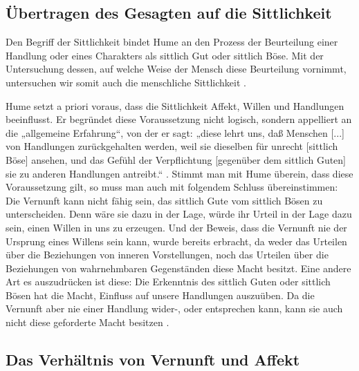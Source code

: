 \documentclass[ngerman,12pt]{diazessay} %
\begin{document}
\begin{doublespace}
\subsection{Übertragen des Gesagten auf die Sittlichkeit}
Den Begriff der Sittlichkeit bindet Hume an den Prozess der Beurteilung einer Handlung oder eines Charakters als sittlich Gut oder sittlich Böse. Mit der Untersuchung dessen, auf welche Weise der Mensch diese Beurteilung vornimmt, untersuchen wir somit auch die menschliche Sittlichkeit \cite[siehe S.532]{Hume.2013}.
\par\bigskip   
Hume setzt a priori voraus, dass die Sittlichkeit Affekt, Willen und Handlungen beeinflusst. Er begründet diese Voraussetzung nicht logisch, sondern appelliert an die „allgemeine Erfahrung“, von der er sagt: „diese lehrt uns, daß Menschen [...] von Handlungen zurückgehalten
werden, weil sie dieselben für unrecht [sittlich Böse] ansehen, und das Gefühl
der Verpflichtung [gegenüber dem sittlich Guten] sie zu anderen Handlungen antreibt.“ \cite[S.533]{Hume.2013}. Stimmt man mit Hume überein, dass diese Voraussetzung gilt, so muss man auch mit folgendem Schluss übereinstimmen: Die Vernunft kann nicht fähig sein, das sittlich Gute vom sittlich Bösen zu unterscheiden. Denn wäre sie dazu in der Lage, würde ihr Urteil in der Lage dazu sein, einen Willen in uns zu erzeugen. Und der Beweis, dass die Vernunft nie der Ursprung eines Willens sein kann, wurde bereits erbracht, da weder das Urteilen über die Beziehungen von inneren Vorstellungen, noch das Urteilen über die Beziehungen von wahrnehmbaren Gegenständen diese Macht besitzt. Eine andere Art es auszudrücken ist diese: Die Erkenntnis des sittlich Guten oder sittlich Bösen hat die Macht, Einfluss auf unsere Handlungen auszuüben. Da die Vernunft aber nie einer Handlung wider-, oder entsprechen kann, kann sie auch nicht diese geforderte Macht besitzen \cite[siehe S.534]{Hume.2013}.

\subsection{Das Verhältnis von Vernunft und Affekt}


\end{doublespace}
\end{document}
